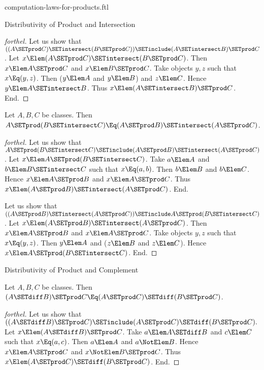 \documentclass{stex}
\begin{document}
\begin{smodule}{computation-laws-for-products.ftl}
\begin{sfragment}{Distributivity of Product and Intersection}
\begin{proof}[forthel]
    Let us show that $((A \SETprod C) \SETintersect (B \SETprod C)) \SETinclude (A \SETintersect B) \SETprod C$. %
      Let $x \Elem (A \SETprod C) \SETintersect (B \SETprod C)$.
      Then $x \Elem A \SETprod C$ and $x \Elem B \SETprod C$.
      Take objects $y, z$ such that $x \Eq (y, z)$.
      Then ($y \Elem A$ and $y \Elem B$) and $z \Elem C$.
      Hence $y \Elem A \SETintersect B$.
      Thus $x \Elem (A \SETintersect B) \SETprod C$.
    End.
  \end{proof}

  \begin{proposition}[forthel,id=FOUNDATIONS_05_954964241285120]
    Let $A, B, C$ be classes.
    Then $A \SETprod (B \SETintersect C) \Eq (A \SETprod B) \SETintersect (A \SETprod C)$.
  \end{proposition}
  \begin{proof}[forthel]
    Let us show that $A \SETprod (B \SETintersect C) \SETinclude (A \SETprod B) \SETintersect (A \SETprod C)$.
      Let $x \Elem A \SETprod (B \SETintersect C)$.
      Take $a \Elem A$ and $b \Elem B \SETintersect C$ such that $x \Eq (a, b)$.
      Then $b \Elem B$ and $b \Elem C$.
      Hence $x \Elem A \SETprod B$ and $x \Elem A \SETprod C$.
      Thus $x \Elem (A \SETprod B) \SETintersect (A \SETprod C)$.
    End.

    Let us show that $((A \SETprod B) \SETintersect (A \SETprod C)) \SETinclude A \SETprod (B \SETintersect C)$. %
      Let $x \Elem (A \SETprod B) \SETintersect (A \SETprod C)$.
      Then $x \Elem A \SETprod B$ and $x \Elem A \SETprod C$.
      Take objects $y, z$ such that $x \Eq (y, z)$.
      Then $y \Elem A$ and ($z \Elem B$ and $z \Elem C$).
      Hence $x \Elem A \SETprod (B \SETintersect C)$.
    End.
  \end{proof}
\end{sfragment}

\begin{sfragment}{Distributivity of Product and Complement}
  \begin{proposition}[forthel,id=FOUNDATIONS_05_6495329908162560]
    Let $A, B, C$ be classes.
    Then $(A \SETdiff B) \SETprod C \Eq (A \SETprod C) \SETdiff (B \SETprod C)$.
  \end{proposition}
  \begin{proof}[forthel]
    Let us show that $((A \SETdiff B) \SETprod C) \SETinclude (A \SETprod C) \SETdiff (B \SETprod C).$ %
      Let $x \Elem (A \SETdiff B) \SETprod C$.
      Take $a \Elem A \SETdiff B$ and $c \Elem C$ such that $x \Eq (a, c)$.
      Then $a \Elem A$ and $a \NotElem B$.
      Hence $x \Elem A \SETprod C$ and $x \NotElem B \SETprod C$.
      Thus $x \Elem (A \SETprod C) \SETdiff (B \SETprod C)$.
    End.


\end{proof}
\end{sfragment}
\end{smodule}
\end{document}
